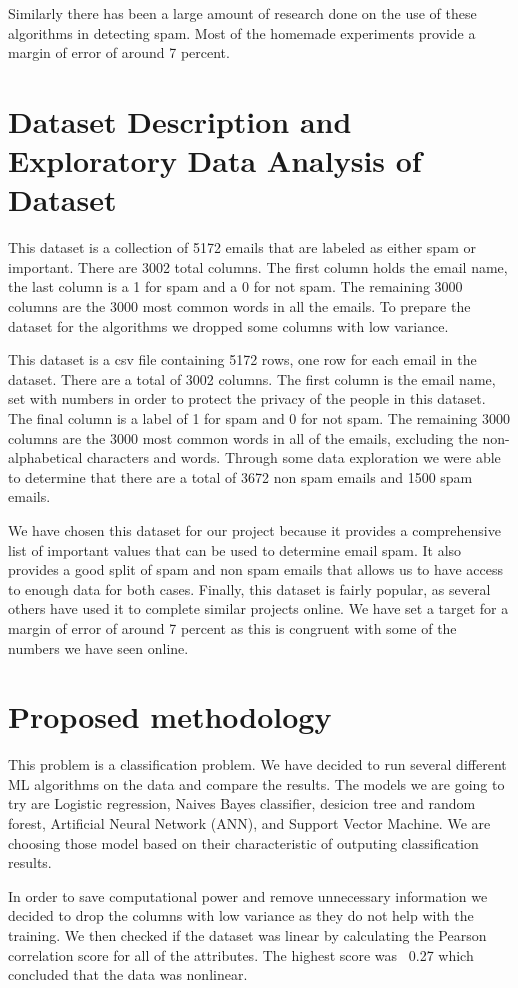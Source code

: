 \documentclass[10pt]{article}
\begin{document}
Similarly there has been a large amount of research done on the use of these algorithms in detecting spam. Most of the homemade experiments provide a margin of error of around 7 percent. 

\section{Dataset Description and Exploratory Data Analysis of Dataset}

This dataset is a collection of 5172 emails that are labeled as either spam or important. There are 3002 total columns. The first column holds the email name, the last column is a 1 for spam and a 0 for not spam. The remaining 3000 columns are the 3000 most common words in all the emails.
To prepare the dataset for the algorithms we dropped some columns with low variance. 

This dataset is a csv file containing 5172 rows, one row for each email in the dataset. There are a total of 3002 columns. The first column is the email name, set with numbers in order to protect the privacy of the people in this dataset. The final column is a label of 1 for spam and 0 for not spam. The remaining 3000 columns are the 3000 most common words in all of the emails, excluding the non-alphabetical characters and words. Through some data exploration we were able to determine that there are a total of 3672 non spam emails and 1500 spam emails. 

We have chosen this dataset for our project because it provides a comprehensive list of important values that can be used to determine email spam. It also provides a good split of spam and non spam emails that allows us to have access to enough data for both cases. Finally, this dataset is fairly popular, as several others have used it to complete similar projects online. We have set a target for a margin of error of around 7 percent as this is congruent with some of the numbers we have seen online.  

\newpage
\section{Proposed methodology}

This problem is a classification problem. We have decided to run several different ML algorithms on the data and compare the results. The models we are going to try are Logistic regression, Naives Bayes classifier, desicion tree and random forest, Artificial Neural Network (ANN), and Support Vector Machine. We are choosing those model based on their characteristic of outputing classification results. 

In order to save computational power and remove unnecessary information we decided to drop the columns with low variance as they do not help with the training. We then checked if the dataset was linear by calculating the Pearson correlation score for all of the attributes. The highest score was ~0.27 which concluded that the data was nonlinear.
\end{document}
